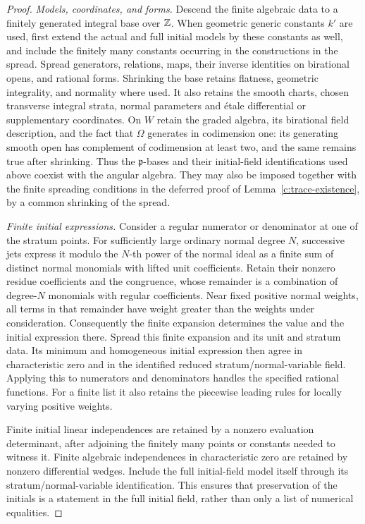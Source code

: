 \begin{proof}
\emph{Models, coordinates, and forms.}
Descend the finite algebraic data to a finitely generated integral base
over $\mathbb Z$.  When geometric generic constants $k'$ are used, first extend
the actual and full initial models by these constants as well, and include
the finitely many constants occurring in the constructions in the spread.
Spread generators, relations, maps, their inverse identities on birational
opens, and rational forms.  Shrinking the base retains flatness, geometric
integrality, and normality where used.  It also retains the smooth charts,
chosen transverse integral strata, normal parameters and \'etale differential
or supplementary coordinates.  On $W$ retain the graded algebra, its
birational field description, and the fact that $\Omega$ generates in
codimension one: its generating smooth open has complement of codimension
at least two, and the same remains true after shrinking.  Thus the
$\mathfrak p$-bases and their initial-field identifications used above coexist with
the angular algebra.  They may also be imposed together with the finite
spreading conditions in the deferred proof of
Lemma~\ref{c:trace-existence}, by a common shrinking of the spread.

\emph{Finite initial expressions.}
Consider a regular numerator or denominator at one of the stratum points.
For sufficiently large ordinary normal degree $N$, successive jets express
it modulo the $N$-th power of the normal ideal as a finite sum of distinct
normal monomials with lifted unit coefficients.  Retain their nonzero
residue coefficients and the congruence, whose remainder is a combination
of degree-$N$ monomials with regular coefficients.  Near fixed positive
normal weights, all terms in that remainder have weight greater than the
weights under consideration.  Consequently the finite expansion determines
the value and the initial expression there.  Spread this finite expansion
and its unit and stratum data.  Its minimum and homogeneous initial
expression then agree in characteristic zero and in the identified reduced
stratum/normal-variable field.  Applying this to numerators and denominators
handles the specified rational functions.  For a finite list it also
retains the piecewise leading rules for locally varying positive weights.

Finite initial linear independences are retained by a nonzero evaluation
determinant, after adjoining the finitely many points or constants needed
to witness it.  Finite algebraic independences in characteristic zero are
retained by nonzero differential wedges.  Include the full initial-field
model itself through its stratum/normal-variable identification.  This
ensures that preservation of the initials is a statement in the full
initial field, rather than only a list of numerical equalities.


\end{proof}
